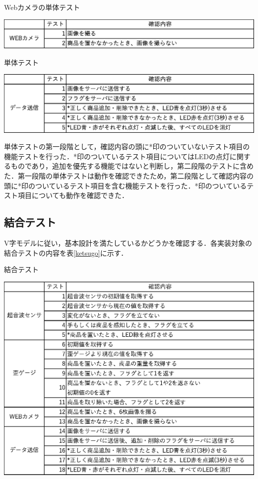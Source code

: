 \begin{table}[htbp]
\centering
\caption{Webカメラの単体テスト}
\includegraphics[width = 15cm]{./picture/webcamera.eps}
\label{webcamera}
\end{table}

\begin{table}[htbp]
\centering
\caption{単体テスト}
\includegraphics[width = 15cm]{./picture/data.eps}
\label{data}
\end{table}

単体テストの第一段階として，確認内容の頭に*印のついていないテスト項目の機能テストを行った．*印のついているテスト項目についてはLEDの点灯に関するものであり，追加を優先する機能ではないと判断し，第二段階のテストに含めた．第一段階の単体テストは動作を確認できたため，第二段階として確認内容の頭に*印のついているテスト項目を含む機能テストを行った．*印のついているテスト項目についても動作を確認できた．


\subsection{結合テスト}

V字モデルに従い，基本設計を満たしているかどうかを確認する．各実装対象の結合テストの内容を表\ref{ketsugo}に示す．


\begin{table}[htbp]
\centering
\caption{結合テスト}
\includegraphics[width = 15cm]{./picture/ketsugo.eps}
\label{ketsugo}
\end{table}

